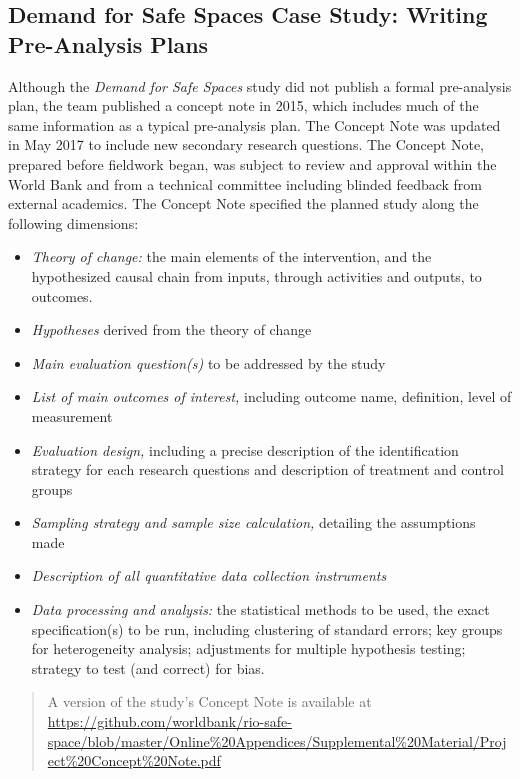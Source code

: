 \documentclass[
]{book}
\providecommand{\tightlist}{%
  \setlength{\itemsep}{0pt}\setlength{\parskip}{0pt}}
\begin{document}
\begin{ex}
\hypertarget{demand-for-safe-spaces-case-study-writing-pre-analysis-plans}{%
\subsection{Demand for Safe Spaces Case Study: Writing Pre-Analysis Plans}\label{demand-for-safe-spaces-case-study-writing-pre-analysis-plans}}

Although the \emph{Demand for Safe Spaces} study did not publish a formal pre-analysis plan, the team published a concept note in 2015, which includes much of the same information as a typical pre-analysis plan. The Concept Note was updated in May 2017 to include new secondary research questions. The Concept Note, prepared before fieldwork began, was subject to review and approval within the World Bank and from a technical committee including blinded feedback from external academics. The Concept Note specified the planned study along the following dimensions:

\begin{itemize}
\tightlist
\item
  \emph{Theory of change:} the main elements of the intervention, and the hypothesized causal chain from inputs, through activities and outputs, to outcomes.
\item
  \emph{Hypotheses} derived from the theory of change
\item
  \emph{Main evaluation question(s)} to be addressed by the study
\item
  \emph{List of main outcomes of interest,} including outcome name, definition, level of measurement
\item
  \emph{Evaluation design,} including a precise description of the identification strategy for each research questions and description of treatment and control groups
\item
  \emph{Sampling strategy and sample size calculation,} detailing the assumptions made
\item
  \emph{Description of all quantitative data collection instruments}
\item
  \emph{Data processing and analysis:} the statistical methods to be used, the exact specification(s) to be run, including clustering of standard errors; key groups for heterogeneity analysis; adjustments for multiple hypothesis testing; strategy to test (and correct) for bias.
\end{itemize}

\begin{quote}
A version of the study's Concept Note is available at \url{https://github.com/worldbank/rio-safe-space/blob/master/Online\%20Appendices/Supplemental\%20Material/Project\%20Concept\%20Note.pdf}
\end{quote}
\end{ex}
\end{document}
